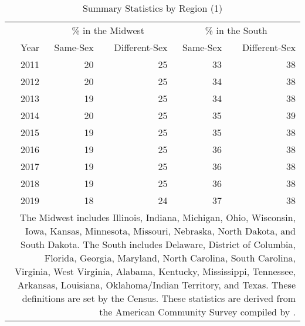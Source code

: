 \begin{table}[htbp]

\caption{Summary Statistics by Region (1)}
\label{region_1} %
\centering
\begin{tabular}[t]{rrrrr}
\toprule
\multicolumn{1}{c}{ } & \multicolumn{2}{c}{\% in the Midwest} & \multicolumn{2}{c}{\% in the South} \\
\cmidrule(l{3pt}r{3pt}){2-3} \cmidrule(l{3pt}r{3pt}){4-5}
Year & Same-Sex & Different-Sex & Same-Sex & Different-Sex\\
\midrule
2011 & 20 & 25 & 33 & 38\\
2012 & 20 & 25 & 34 & 38\\
2013 & 19 & 25 & 34 & 38\\
2014 & 20 & 25 & 35 & 39\\
2015 & 19 & 25 & 35 & 38\\
2016 & 19 & 25 & 36 & 38\\
2017 & 19 & 25 & 36 & 38\\
2018 & 19 & 25 & 36 & 38\\
2019 & 18 & 24 & 37 & 38\\
\bottomrule
\multicolumn{5}{p{.65\linewidth}}{\footnotesize The Midwest includes Illinois, Indiana, Michigan, Ohio, Wisconsin, Iowa, Kansas, Minnesota, Missouri, Nebraska, North Dakota, and South Dakota. The South includes Delaware, District of Columbia, Florida, Georgia, Maryland, North Carolina, South Carolina, Virginia, West Virginia, Alabama, Kentucky, Mississippi, Tennessee, Arkansas, Louisiana, Oklahoma/Indian Territory, and Texas. These definitions are set by the Census. These statistics are derived from the American Community Survey compiled by \citet{28}.} \\
\end{tabular}
\end{table}
